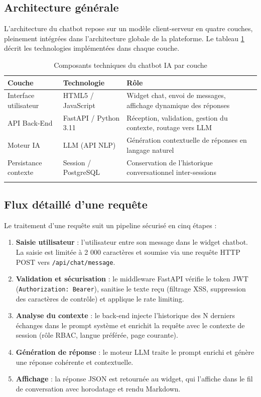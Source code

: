 \subsection{Architecture générale}
L'architecture du chatbot repose sur un modèle client-serveur en quatre couches, pleinement intégrées dans l'architecture globale de la plateforme. Le tableau \ref{tab:chatbot_layers} décrit les technologies implémentées dans chaque couche.

\begin{longtable}{|m{3.5cm}|m{3.5cm}|m{6cm}|}
\hline
\textbf{Couche} & \textbf{Technologie} & \textbf{Rôle} \\
\hline
\endhead
\endfoot
\endlastfoot
\hline
Interface utilisateur & HTML5 / JavaScript & Widget chat, envoi de messages, affichage dynamique des réponses \\
\hline
API Back-End & FastAPI / Python 3.11 & Réception, validation, gestion du contexte, routage vers LLM \\
\hline
Moteur IA & LLM (API NLP) & Génération contextuelle de réponses en langage naturel \\
\hline
Persistance contexte & Session / PostgreSQL & Conservation de l'historique conversationnel inter-sessions \\
\hline
\captionsetup{justification=centering,margin=2cm}
\caption{Composants techniques du chatbot IA par couche}
\label{tab:chatbot_layers}
\end{longtable}

\subsection{Flux détaillé d'une requête}
Le traitement d'une requête suit un pipeline sécurisé en cinq étapes :
\begin{enumerate}
    \item \textbf{Saisie utilisateur} : l'utilisateur entre son message dans le widget chatbot. La saisie est limitée à 2 000 caractères et soumise via une requête HTTP POST vers \texttt{/api/chat/message}.
    \item \textbf{Validation et sécurisation} : le middleware FastAPI vérifie le token JWT (\texttt{Authorization: Bearer}), sanitise le texte reçu (filtrage XSS, suppression des caractères de contrôle) et applique le rate limiting.
    \item \textbf{Analyse du contexte} : le back-end injecte l'historique des N derniers échanges dans le prompt système et enrichit la requête avec le contexte de session (rôle RBAC, langue préférée, page courante).
    \item \textbf{Génération de réponse} : le moteur LLM traite le prompt enrichi et génère une réponse cohérente et contextuelle.
    \item \textbf{Affichage} : la réponse JSON est retournée au widget, qui l'affiche dans le fil de conversation avec horodatage et rendu Markdown.
\end{enumerate}

